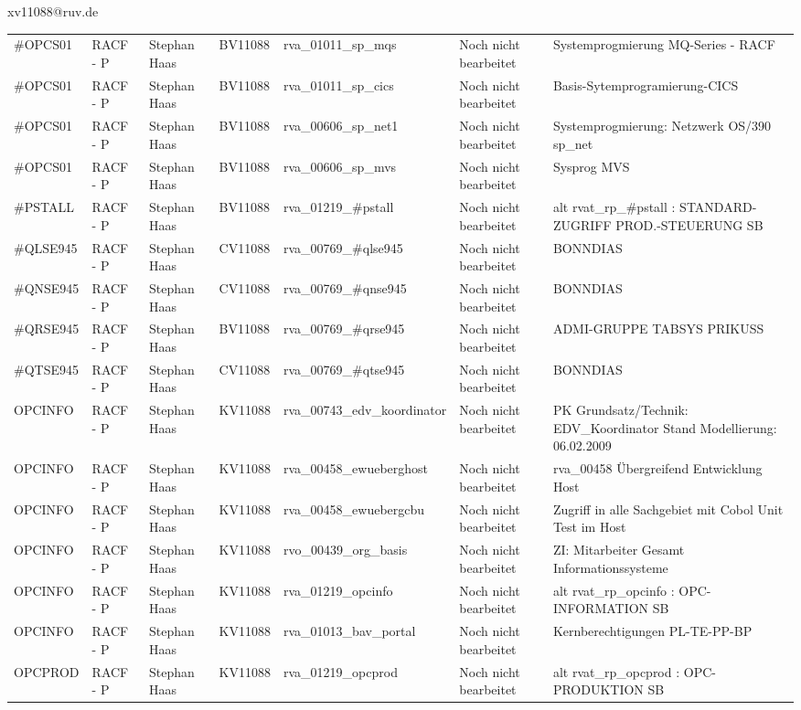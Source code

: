 \documentclass[a4paper,landscape,12pt]{letter}
\begin{document}
\begin{letter}{xv11088@ruv.de\hfill \break}
\begin{tiny}
\begin{longtable}{|p{35mm}|p{15mm}|p{25mm}|p{10mm}|p{40mm}|p{50mm}|p{50mm}|}
\#OPCS01 & RACF - P & Stephan Haas & BV11088 & rva\_01011\_sp\_mqs & Noch nicht bearbeitet & Systemprogmierung MQ-Series - RACF \\
\#OPCS01 & RACF - P & Stephan Haas & BV11088 & rva\_01011\_sp\_cics & Noch nicht bearbeitet & Basis-Sytemprogramierung-CICS \\
\#OPCS01 & RACF - P & Stephan Haas & BV11088 & rva\_00606\_sp\_net1 & Noch nicht bearbeitet & Systemprogmierung: Netzwerk OS/390 sp\_net \\
\#OPCS01 & RACF - P & Stephan Haas & BV11088 & rva\_00606\_sp\_mvs & Noch nicht bearbeitet & Sysprog MVS \\
\#PSTALL & RACF - P & Stephan Haas & BV11088 & rva\_01219\_\#pstall & Noch nicht bearbeitet & alt rvat\_rp\_\#pstall          : STANDARD-ZUGRIFF PROD.-STEUERUNG SB \\
\#QLSE945 & RACF - P & Stephan Haas & CV11088 & rva\_00769\_\#qlse945 & Noch nicht bearbeitet & BONNDIAS \\
\#QNSE945 & RACF - P & Stephan Haas & CV11088 & rva\_00769\_\#qnse945 & Noch nicht bearbeitet & BONNDIAS \\
\#QRSE945 & RACF - P & Stephan Haas & BV11088 & rva\_00769\_\#qrse945 & Noch nicht bearbeitet & ADMI-GRUPPE TABSYS PRIKUSS \\
\#QTSE945 & RACF - P & Stephan Haas & CV11088 & rva\_00769\_\#qtse945 & Noch nicht bearbeitet & BONNDIAS \\
OPCINFO & RACF - P & Stephan Haas & KV11088 & rva\_00743\_edv\_koordinator & Noch nicht bearbeitet & PK Grundsatz/Technik: EDV\_Koordinator Stand Modellierung: 06.02.2009 \\
OPCINFO & RACF - P & Stephan Haas & KV11088 & rva\_00458\_ewueberghost & Noch nicht bearbeitet & rva\_00458 Übergreifend Entwicklung Host \\
OPCINFO & RACF - P & Stephan Haas & KV11088 & rva\_00458\_ewuebergcbu & Noch nicht bearbeitet & Zugriff in alle Sachgebiet mit Cobol Unit Test im Host \\
OPCINFO & RACF - P & Stephan Haas & KV11088 & rvo\_00439\_org\_basis & Noch nicht bearbeitet & ZI: Mitarbeiter Gesamt Informationssysteme \\
OPCINFO & RACF - P & Stephan Haas & KV11088 & rva\_01219\_opcinfo & Noch nicht bearbeitet & alt rvat\_rp\_opcinfo          : OPC- INFORMATION                         SB \\
OPCINFO & RACF - P & Stephan Haas & KV11088 & rva\_01013\_bav\_portal & Noch nicht bearbeitet & Kernberechtigungen PL-TE-PP-BP \\
OPCPROD & RACF - P & Stephan Haas & KV11088 & rva\_01219\_opcprod & Noch nicht bearbeitet & alt rvat\_rp\_opcprod          : OPC-PRODUKTION                           SB \\


\end{longtable}
\end{tiny}
\end{letter}
\end{document}
